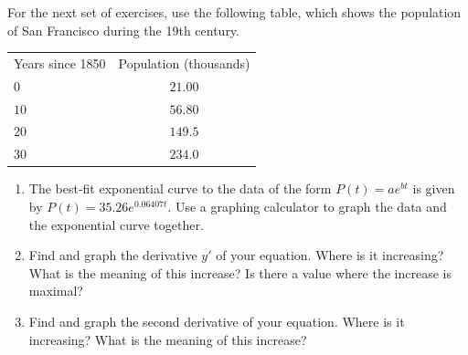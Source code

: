\documentclass{exercises}
\begin{document}
For the next set of exercises, use the following table, which shows the population of San Francisco during the 19th century.


\begin{center}
\begin{tabular}{lc}
\hline
Years since 1850 & Population (thousands) \\
$0$ & $21.00$ \\
$10$ & $56.80$ \\
$20$ & $149.5$ \\
$30$ & $234.0$ \\
\hline
\end{tabular}
\end{center}

\begin{enumerate}[resume]
\item \techrequired The best-fit exponential curve to the data of the form $P(t)=ae^{bt}$ is given by $P(t)=35.26e^{0.06407t}$. Use a graphing calculator to graph the data and the exponential curve together.
\item \techrequired Find and graph the derivative $y'$ of your equation. Where is it increasing? What is the meaning of this increase? Is there a value where the increase is maximal?
\item \techrequired Find and graph the second derivative of your equation. Where is it increasing? What is the meaning of this increase?
\end{enumerate}
\end{document}
